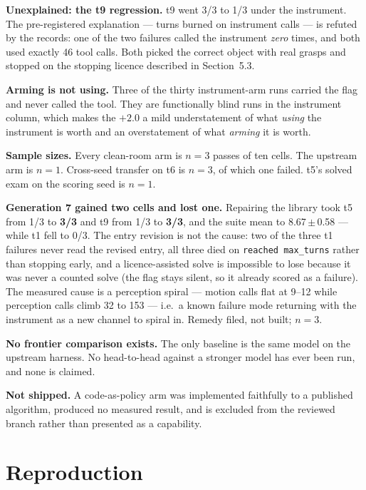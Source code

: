 \documentclass[11pt,a4paper]{article}
\begin{document}
\textbf{Unexplained: the t9 regression.} t9 went 3/3 to 1/3 under the
instrument. The pre-registered explanation --- turns burned on instrument calls
--- is refuted by the records: one of the two failures called the instrument
\emph{zero} times, and both used exactly 46 tool calls. Both picked the correct
object with real grasps and stopped on the stopping licence described in
Section~5.3.

\textbf{Arming is not using.} Three of the thirty instrument-arm runs carried
the flag and never called the tool. They are functionally blind runs in the
instrument column, which makes the $+2.0$ a mild understatement of what
\emph{using} the instrument is worth and an overstatement of what \emph{arming}
it is worth.

\textbf{Sample sizes.} Every clean-room arm is $n=3$ passes of ten cells. The
upstream arm is $n=1$. Cross-seed transfer on t6 is $n=3$, of which one failed.
t5's solved exam on the scoring seed is $n=1$.

\textbf{Generation 7 gained two cells and lost one.} Repairing the library took
t5 from 1/3 to \textbf{3/3} and t9 from 1/3 to \textbf{3/3}, and the suite mean
to 8.67\,$\pm$\,0.58 --- while t1 fell to 0/3. The entry revision is not the
cause: two of the three t1 failures never read the revised entry, all three died
on \texttt{reached max\_turns} rather than stopping early, and a licence-assisted
solve is impossible to lose because it was never a counted solve (the flag stays
silent, so it already scored as a failure). The measured cause is a perception
spiral --- motion calls flat at 9--12 while perception calls climb 32 to 153 ---
i.e.\ a known failure mode returning with the instrument as a new channel to
spiral in. Remedy filed, not built; $n=3$.

\textbf{No frontier comparison exists.} The only baseline is the same model on
the upstream harness. No head-to-head against a stronger model has ever been
run, and none is claimed.

\textbf{Not shipped.} A code-as-policy arm was implemented faithfully to a
published algorithm, produced no measured result, and is excluded from the
reviewed branch rather than presented as a capability.

\section{Reproduction}
\end{document}
